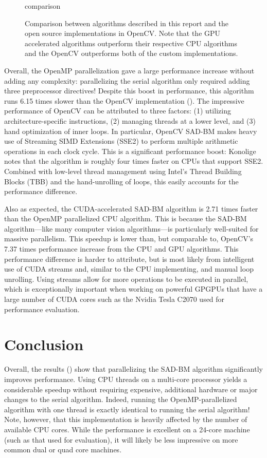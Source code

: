 \documentclass{article}
\begin{document}
\begin{figure}
    \centering
    {comparison}
    \caption{
        Comparison between algorithms described in this report and the open
        source implementations in OpenCV. Note that the GPU accelerated
        algorithms outperform their respective CPU algorithms and the OpenCV
        outperforms both of the custom implementations.
    }
    \label{fig:perf-comp}
\end{figure}

Overall, the OpenMP parallelization gave a large performance increase without
adding any complexity: parallelizing the serial algorithm only required adding
three preprocessor directives! Despite this boost in performance, this
algorithm runs 6.15 times slower than the OpenCV implementation
(). The impressive performance of OpenCV can be attributed
to three factors: (1) utilizing architecture-specific instructions, (2)
managing threads at a lower level, and (3) hand optimization of inner loops.
In particular, OpenCV SAD-BM makes heavy use of Streaming SIMD Extensions
(SSE2) to perform multiple arithmetic operations in each clock cycle. This is a
significant performance boost: Konolige~\cite{konolige97} notes that the
algorithm is roughly four times faster on CPUs that support SSE2. Combined with
low-level thread management using Intel's Thread Building Blocks (TBB) and the
hand-unrolling of loops, this easily accounts for the performance difference.

Also as expected, the CUDA-accelerated SAD-BM algorithm is 2.71 times faster
than the OpenMP parallelized CPU algorithm. This is because the SAD-BM
algorithm---like many computer vision algorithms---is particularly well-suited
for massive parallelism. This speedup is lower than, but comparable to,
OpenCV's 7.37 times performance increase from the CPU and GPU algorithms. This
performance difference is harder to attribute, but is most likely from
intelligent use of CUDA streams and, similar to the CPU implementing, and manual
loop unrolling. Using streams allow for more operations to be executed in
parallel, which is exceptionally important when working on powerful GPGPUs that
have a large number of CUDA cores such as the Nvidia Tesla C2070 used for
performance evaluation.

\section{Conclusion}
\label{sec:conc}
Overall, the results () show that parallelizing the SAD-BM
algorithm significantly improves performance. Using CPU threads on a multi-core
processor yields a considerable speedup without requiring expensive, additional
hardware or major changes to the serial algorithm. Indeed, running the
OpenMP-parallelized algorithm with one thread is exactly identical to running
the serial algorithm! Note, however, that this implementation is heavily
affected by the number of available CPU cores. While the performance is
excellent on a 24-core machine (such as that used for evaluation), it will
likely be less impressive on more common dual or quad core machines.
\end{document}

